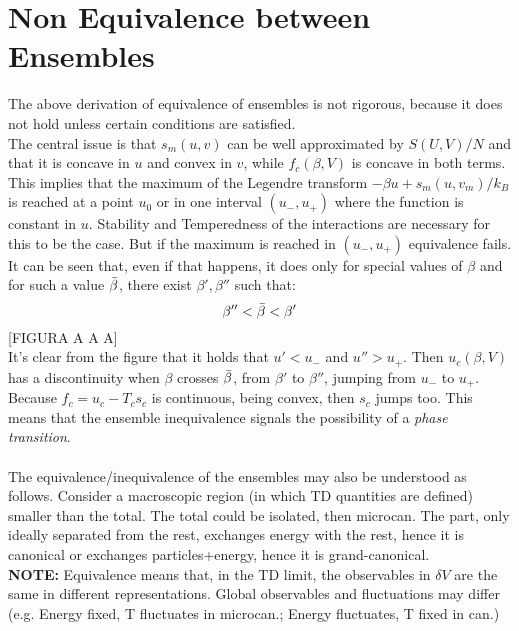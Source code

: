 \documentclass{article}
\begin{document}
\section{Non Equivalence between Ensembles}
The above derivation of equivalence of ensembles is not rigorous, because it does not hold unless certain conditions are satisfied. \\
The central issue is that $s_m (u,v)$ can be well approximated by $S(U,V)/N$ and that it is concave in $u$ and convex in $v $, while $f_c (\beta,V) $ is concave in both terms. This implies that the maximum of the Legendre transform $-\beta u + s_m(u,v_m)/k_B$ is reached at a point $u_0$ or in one interval $(u_-,u_+)$ where the function is constant in $u$.  Stability and Temperedness of the interactions are necessary for this to be the case. But if the maximum is reached in $(u_-,u_+)$ equivalence fails.\\
It can be seen that, even if that happens, it does only for special values of $\beta$ and for such a value $\Bar{\beta}$, there exist $\beta',\beta''$ such that:$$ \beta''<\Bar{\beta}<\beta'$$
[FIGURA A A A]\\
\newline
It's clear from the figure that it holds that $u'<u_-$ and $u''>u_+$. Then $u_c(\beta, V)$ has a discontinuity when $\beta$ crosses $\Bar{\beta}$, from $\beta'$ to $\beta''$, jumping from $u_-$ to $u_+$. Because $f_c = u_c - T_c s_c$ is continuous, being convex, then $s_c$ jumps too. This means that the ensemble inequivalence signals the possibility of a \textit{phase transition}. \\
\newline
[FIGURAAAA] \\
\newline
The equivalence/inequivalence of the ensembles may also be understood as follows. Consider a macroscopic region (in which TD quantities are defined) smaller than the total. The total could be isolated, then microcan. The part, only ideally separated from the rest, exchanges energy with the rest, hence it is canonical or exchanges particles+energy, hence it is grand-canonical. \\
\newline
\textbf{NOTE:}
Equivalence means that, in the TD limit, the observables in $\delta V$ are the same in different representations. Global observables and fluctuations may differ (e.g. Energy fixed, T fluctuates in microcan.; Energy fluctuates, T fixed in can.)\\
\newline
\end{document}
